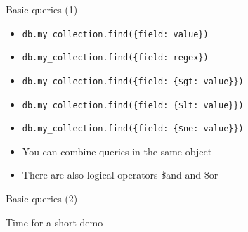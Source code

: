 \begin{frame}[fragile]{Basic queries (1)}
  \begin{itemize}
    \item \lstinline[basicstyle=\ttfamily]|db.my_collection.find({field: value})|
    \item \lstinline[basicstyle=\ttfamily]|db.my_collection.find({field: regex})|
    \item \lstinline[basicstyle=\ttfamily]|db.my_collection.find({field: {$gt: value}})|
    \item \lstinline[basicstyle=\ttfamily]|db.my_collection.find({field: {$lt: value}})|
    \item \lstinline[basicstyle=\ttfamily]|db.my_collection.find({field: {$ne: value}})|
    \item You can combine queries in the same object
    \item There are also logical operators \$and and \$or
  \end{itemize}
\end{frame}

\begin{frame}{Basic queries (2)}
  \begin{center}
    {\huge Time for a short demo}
  \end{center}
\end{frame}
